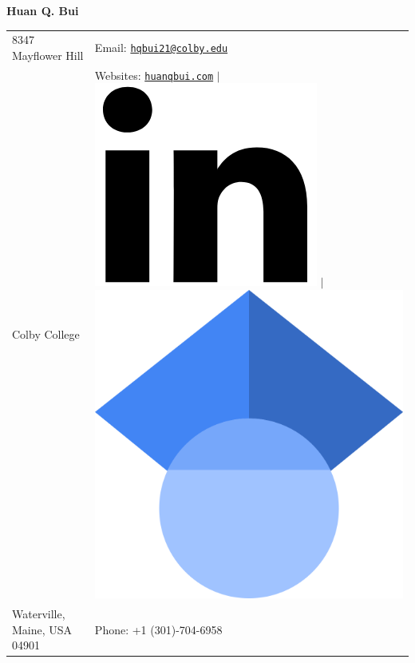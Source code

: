 \documentclass[10pt]{article}
\begin{document}
\noindent  
\begin{center}
{\Huge{\textbf{Huan Q. Bui}}}
\end{center}
\vspace{-10pt}
\hrulefill
\vspace{-1ex}

\normalsize


\begin{center}
\begin{tabular}{l l}
     8347 Mayflower Hill 		 & \hspace{1in} Email: \href{mailto:hqbui21@colby.edu}{\texttt{hqbui21@colby.edu}} \\
     Colby College 				 & \hspace{1in}  Websites: \href{www.huanqbui.com}{\texttt{huanqbui.com}} $\vert$ 					\href{https://www.linkedin.com/in/huan-bui/}{\includegraphics[scale=0.04]{linkedin_logo.PNG}}  $\vert$ 	\href{https://scholar.google.com/citations?user=ejxM5pkAAAAJ\&hl=en}{\includegraphics[scale=0.0075]{google-scholar.png}} \\
 	Waterville, Maine, USA 04901 & \hspace{1in} Phone: +1 (301)-704-6958\\
\end{tabular}
\end{center}
\end{document}

